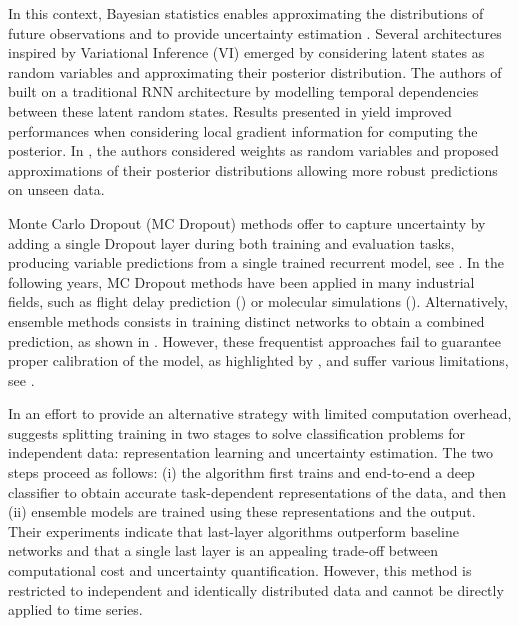 \documentclass{article}
\begin{document}
In this context, Bayesian statistics enables approximating the distributions of future observations and to provide uncertainty estimation \cite{Hinton1995BayesianLF}.
Several architectures inspired by Variational Inference (VI) emerged by considering latent states as random variables and approximating their posterior distribution.
The authors of \cite{Chung2015NIPS} built on a traditional RNN architecture by modelling temporal dependencies between these latent random states.
Results presented in \cite{Fortunato2017bayesian} yield improved performances when considering local gradient information for computing the posterior.
In \cite{Blundell2015}, the authors considered weights as random variables and proposed approximations of their posterior distributions allowing more robust predictions on unseen data.

Monte Carlo Dropout (MC Dropout) methods offer to capture uncertainty by adding a single  Dropout layer during both training and evaluation tasks, producing variable predictions from a single trained recurrent model, see \cite{Gal2016NIPS}.
In the following years, MC Dropout methods have been applied in many industrial fields, such as flight delay prediction (\cite{Vandal2018}) or molecular simulations (\cite{Wen2020UncertaintyQI}).
Alternatively, ensemble methods consists in training distinct networks to obtain a combined prediction, as shown in \cite{Pearce2018}.
However, these frequentist approaches fail to guarantee proper calibration of the model, as highlighted by \cite{ashukha2020pitfalls}, and suffer various limitations, see \cite{Fong2020}.

In an effort to provide an alternative strategy with limited computation overhead, \cite{Brosse2020OnLA} suggests splitting training in two stages to solve classification problems for independent data: representation learning and uncertainty estimation. The two steps proceed as follows: (i) the algorithm first trains and end-to-end a deep classifier to obtain accurate task-dependent representations of the data, and then (ii) ensemble models are trained using these representations and the output. Their experiments indicate that last-layer algorithms outperform baseline networks and that a single last layer is an appealing trade-off between computational cost and uncertainty quantification. However, this method is restricted to independent and identically distributed data and cannot be directly applied to time series.
\end{document}

